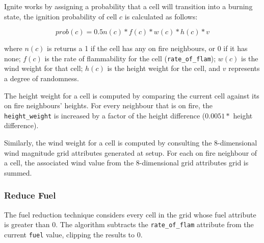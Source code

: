 \documentclass[11pt, a4paper, titlepage]{article}
\newcommand{\code}[1]{\colorbox{light-gray}{\texttt{#1}}}
\begin{document}


Ignite works by assigning a probability that a cell will transition into a burning state, the ignition probability of cell $c$ is calculated as follows:

\[ prob(c) = 0.5n(c)*f(c)*w(c)*h(c)*v \]

where $n(c)$ is returns a 1 if the cell has any on fire neighbours, or 0 if it has none; $f(c)$ is the rate of flammability for the cell (\code{rate\_of\_flam}); $w(c)$ is the wind weight for that cell; $h(c)$ is the height weight for the cell, and $v$ represents a degree of randomness.

The height weight for a cell is computed by comparing the current cell against its on fire neighbours' heights. For every neighbour that is on fire, the \code{height\_weight} is increased by a factor of the height difference ($0.0051 *$ height difference).  

Similarly, the wind weight for a cell is computed by consulting the 8-dimensional wind magnitude grid attributes generated at setup. For each on fire neighbour of a cell, the associated wind value from the 8-dimensional grid attributes grid is summed.  










\subsubsection{Reduce Fuel}
The fuel reduction technique considers every cell in the grid whose fuel attribute is greater than 0. The algorithm subtracts the \code{rate\_of\_flam} attribute from the current \code{fuel} value, clipping the results to 0. 
\end{document}
